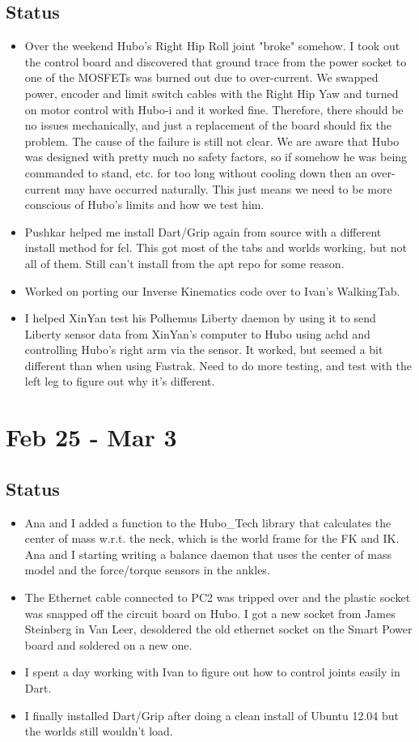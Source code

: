 \documentclass[letterpaper, 10 pt]{report}
\begin{document}
\subsection*{Status}
\begin{itemize}
\item Over the weekend Hubo's Right Hip Roll joint "broke" somehow. I took out
the control board and discovered that ground trace from the power socket to one
of the MOSFETs was burned out due to over-current. We swapped power, encoder and
limit switch cables with the Right Hip Yaw and turned on motor control with
Hubo-i and it worked fine. Therefore, there should be no issues mechanically,
and just a replacement of the board should fix the problem. The cause of the
failure is still not clear. We are aware that Hubo was designed with pretty much
no safety factors, so if somehow he was being commanded to stand, etc. for too
long without cooling down then an over-current may have occurred naturally. This
just means we need to be more conscious of Hubo's limits and how we test him.
\item Pushkar helped me install Dart/Grip again from source with a different install
method for fcl. This got most of the tabs and worlds working, but not all of
them. Still can't install from the apt repo for some reason.
\item Worked on porting our Inverse Kinematics code over to Ivan's WalkingTab.
\item I helped XinYan test his Polhemus Liberty daemon by using it to send Liberty
sensor data from XinYan's computer to Hubo using achd and controlling Hubo's
right arm via the sensor. It worked, but seemed a bit different than when using
Fastrak. Need to do more testing, and test with the left leg to figure out why
it's different.
\end{itemize}

\section*{Feb 25 - Mar 3}
\subsection*{Status}
\begin{itemize}
\item Ana and I added a function to the Hubo\_Tech library that calculates the
center of mass w.r.t. the neck, which is the world frame for the FK and IK.
Ana and I starting writing a balance daemon that uses the center of mass model
and the force/torque sensors in the ankles.
\item The Ethernet cable connected to PC2 was tripped over and the plastic socket was
snapped off the circuit board on Hubo. I got a new socket from James Steinberg
in Van Leer, desoldered the old ethernet socket on the Smart Power board and
soldered on a new one.
\item I spent a day working with Ivan to figure out how to control joints easily in
Dart.
\item I finally installed Dart/Grip after doing a clean install of Ubuntu 12.04 but
the worlds still wouldn't load.
\end{itemize}
\end{document}
